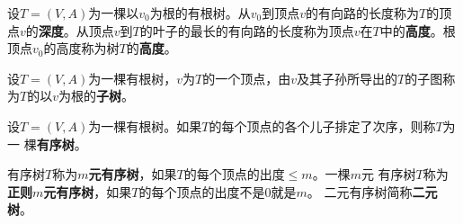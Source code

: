     \begin{Def}
    设$T=(V,A)$为一棵以$v_0$为根的有根树。从$v_0$到顶点$v$的有向路的长度称为$T$的顶点$v$的{\bfseries 深度}。从顶点$v$到$T$的叶子的最长的有向路的长度称为顶点$v$在$T$中的{\bfseries 高度}。根顶点$v_0$的高度称为树$T$的{\bfseries 高度}。
  \end{Def}

    \begin{Def}
    设$T=(V,A)$为一棵有根树，$v$为$T$的一个顶点，由$v$及其子孙所导出的$T$的子图称为$T$的以$v$为根的{\bfseries 子树}。
  \end{Def}

    \begin{Def}
    设$T=(V,A)$为一棵有根树。如果$T$的每个顶点的各个儿子排定了次序，则称$T$为一
    棵{\bfseries 有序树}。
  \end{Def}

    \begin{Def}
    有序树$T$称为{\bfseries $m$元有序树}，如果$T$的每个顶点的出度$\leq m$。一棵$m$元
    有序树$T$称为{\bfseries 正则$m$元有序树}，如果$T$的每个顶点的出度不是$0$就是$m$。
    二元有序树简称{\bfseries 二元树}。
  \end{Def}




\chapter{}
